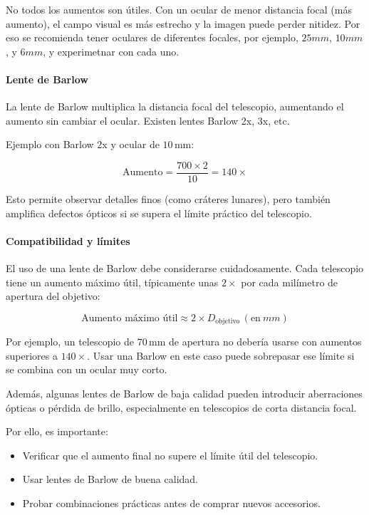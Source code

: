 No todos los aumentos son útiles. Con un ocular de menor distancia focal (más aumento), el campo visual es más estrecho y la imagen puede perder nitidez. Por eso se recomienda tener oculares de diferentes focales, por ejemplo, $25mm$, $10mm$, y $6mm$, y experimetnar con cada uno.


\paragraph{Lente de Barlow}
La lente de Barlow multiplica la distancia focal del telescopio, aumentando el aumento sin cambiar el ocular. Existen lentes Barlow 2x, 3x, etc.

Ejemplo con Barlow 2x y ocular de $10\,\mathrm{mm}$:

\[
\text{Aumento} = \frac{700 \times 2}{10} = 140\times
\]

Esto permite observar detalles finos (como cráteres lunares), pero también amplifica defectos ópticos si se supera el límite práctico del telescopio.

\paragraph{Compatibilidad y límites}
El uso de una lente de Barlow debe considerarse cuidadosamente. Cada telescopio tiene un aumento máximo útil, típicamente unas $2\times$ por cada milímetro de apertura del objetivo:

\begin{equation}
	\text{Aumento máximo útil} \approx 2 \times D_{\text{objetivo}} \, (\mathrm{en}\ mm)
	\label{eq:aumento_maximo}
\end{equation}

Por ejemplo, un telescopio de $70\,\mathrm{mm}$ de apertura no debería usarse con aumentos superiores a $140\times$. Usar una Barlow en este caso puede sobrepasar ese límite si se combina con un ocular muy corto.

Además, algunas lentes de Barlow de baja calidad pueden introducir aberraciones ópticas o pérdida de brillo, especialmente en telescopios de corta distancia focal.

Por ello, es importante:
\begin{itemize}
	\item Verificar que el aumento final no supere el límite útil del telescopio.
	\item Usar lentes de Barlow de buena calidad.
	\item Probar combinaciones prácticas antes de comprar nuevos accesorios.
\end{itemize}


